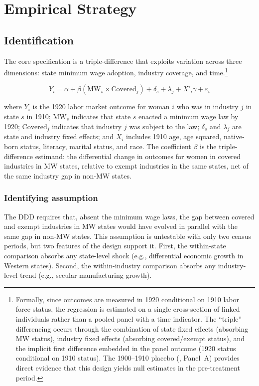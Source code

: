\documentclass[12pt]{article}
\begin{document}
\section{Empirical Strategy}
\label{sec:strategy}

\subsection{Identification}

The core specification is a triple-difference that exploits variation across three dimensions: state minimum wage adoption, industry coverage, and time.\footnote{Formally, since outcomes are measured in 1920 conditional on 1910 labor force status, the regression is estimated on a single cross-section of linked individuals rather than a pooled panel with a time indicator. The ``triple'' differencing occurs through the combination of state fixed effects (absorbing MW status), industry fixed effects (absorbing covered/exempt status), and the implicit first difference embedded in the panel outcome (1920 status conditional on 1910 status). The 1900--1910 placebo (, Panel~A) provides direct evidence that this design yields null estimates in the pre-treatment period.}

\begin{equation}
Y_{i} = \alpha + \beta (\text{MW}_{s} \times \text{Covered}_{j}) + \delta_{s} + \lambda_{j} + X'_{i}\gamma + \varepsilon_{i}
\label{eq:ddd}
\end{equation}

\noindent where $Y_i$ is the 1920 labor market outcome for woman $i$ who was in industry $j$ in state $s$ in 1910; $\text{MW}_s$ indicates that state $s$ enacted a minimum wage law by 1920; $\text{Covered}_j$ indicates that industry $j$ was subject to the law; $\delta_s$ and $\lambda_j$ are state and industry fixed effects; and $X_i$ includes 1910 age, age squared, native-born status, literacy, marital status, and race. The coefficient $\beta$ is the triple-difference estimand: the differential change in outcomes for women in covered industries in MW states, relative to exempt industries in the same states, net of the same industry gap in non-MW states.

\subsubsection*{Identifying assumption} The DDD requires that, absent the minimum wage laws, the gap between covered and exempt industries in MW states would have evolved in parallel with the same gap in non-MW states. This assumption is untestable with only two census periods, but two features of the design support it. First, the within-state comparison absorbs any state-level shock (e.g., differential economic growth in Western states). Second, the within-industry comparison absorbs any industry-level trend (e.g., secular manufacturing growth).
\end{document}
